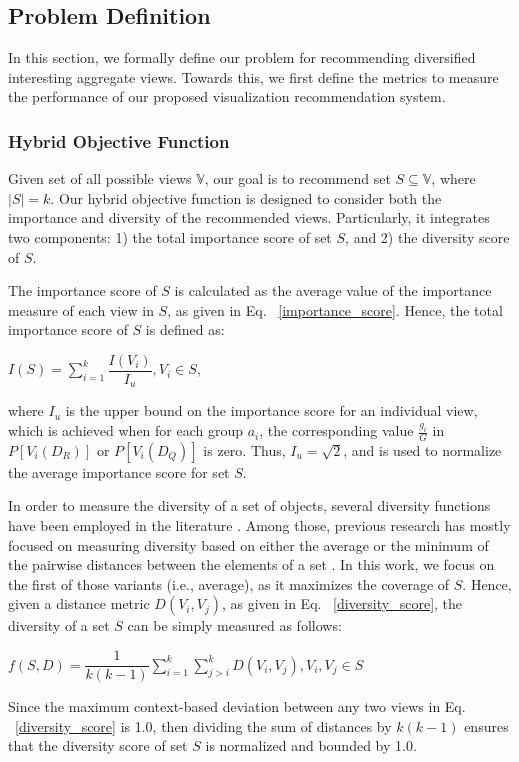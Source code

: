 
\subsection{Problem Definition}\label{subsec:problem_definition}
In this section, we formally define our problem for recommending diversified interesting aggregate views.  
%
Towards this, we first define the metrics to measure the performance of our proposed visualization recommendation system.


\subsubsection{Hybrid Objective Function}

Given set of all possible views $ \mathbb{V} $, our goal is to recommend set $S \subseteq \mathbb{V}$, where $|S| = k$. 
%
Our hybrid objective function is designed to consider both the importance and diversity of the recommended views. 
%
Particularly, it integrates two components: 1) the total importance score of set $S$, and 2) the diversity score of $S$.

The importance score of $S$ is calculated as the average value of the importance measure of each view in $S$, as given in Eq. ~\ref{importance_score}. 
%
Hence, the total importance score of $S$ is defined as: 
\begin{center}
$ I\left(S\right)= \sum_{i=1}^{k} \dfrac{I(V_i )}{I_u}, V_i  \in S $, 
\end{center}
where $I_u$ is the upper bound on the importance score for an individual view, which is achieved when for each group $a_i$, the corresponding value $\frac{g_i}{G}$ in $P[V_{i}(D_R)]$ or $P[V_{i}(D_Q)]$ is zero. Thus, $I_u = \sqrt{2}$, and is used to normalize the average importance score for set $S$. 

In order to measure the diversity of a set of objects, several diversity functions have been employed in the literature \cite{Vieira2011, Clarke2008}. 
%
Among those, previous research has mostly focused on measuring diversity based on either the average or the minimum of the pairwise distances between the elements of a set \cite{Wu2014}. 
%
In this work, we focus on the first of those variants (i.e., average), as it maximizes the coverage of $S$. 
%
Hence, given a distance metric $ D\left(V_i, V_j\right) $, as given in Eq. ~\ref{diversity_score}, the diversity of a set $S$ can be simply measured as follows:
\begin{center}
$ f\left(S,D\right)= \dfrac{1}{k\left(k-1\right)}  \sum_{i=1}^{k} \sum_{j>i}^{k} D\left(V_i,V_j\right) ,V_i,V_j  \in S $
\end{center}
Since the maximum context-based deviation between any two views in Eq. ~\ref{diversity_score}  is 1.0, then dividing the sum of distances by $k\left(k-1\right)$ ensures that the diversity score of set $S$ is normalized and bounded by 1.0.

